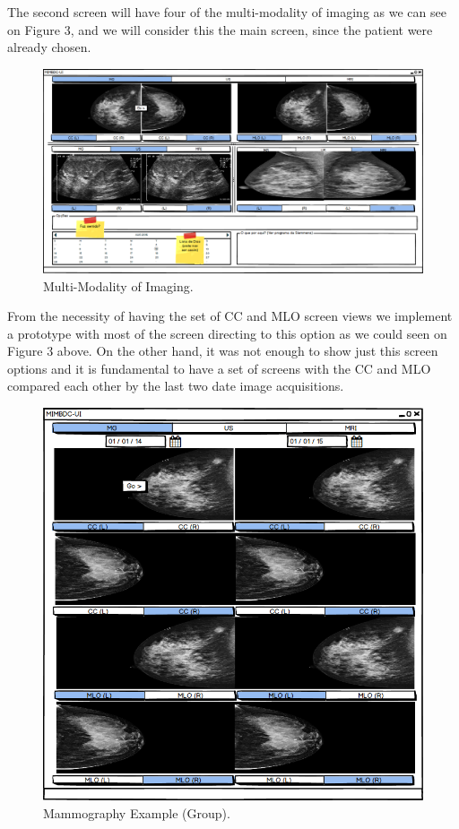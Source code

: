 \clearpage

The second screen will have four of the multi-modality of imaging as we can see on Figure 3, and we will consider this the main screen, since the patient were already chosen.

\begin{figure}[!hbt]
\centering
\includegraphics[width=1.00\textwidth]{multimodalidade.png}
\caption{\label{MMI}Multi-Modality of Imaging.
}
\end{figure}

\clearpage

From the necessity of having the set of CC and MLO screen views we implement a prototype with most of the screen directing to this option as we could seen on Figure 3 above. On the other hand, it was not enough to show just this screen options and it is fundamental to have a set of screens with the CC and MLO compared each other by the last two date image acquisitions.

\begin{figure}[!hbt]
\centering
\includegraphics[width=1.00\textwidth]{MG_(Group).png}
\caption{\label{fig:PTM}Mammography Example (Group).
}
\end{figure}

